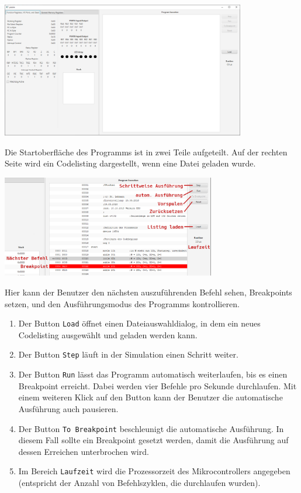 \documentclass[a4paper]{article}
\begin{document}
\begin{center}
    \includegraphics[width=0.8\textwidth]{img/startup}
\end{center}

Die Startoberfläche des Programms ist in zwei Teile aufgeteilt.
Auf der rechten Seite wird ein Codelisting dargestellt, wenn eine Datei geladen wurde.

\begin{center}
    \includegraphics[width=0.7\textwidth]{img/bprunview}
\end{center}

Hier kann der Benutzer den nächsten auszuführenden Befehl sehen, Breakpoints setzen, und den Ausführungsmodus des Programms kontrollieren.
\begin{enumerate}
\item Der Button \texttt{Load} öffnet einen Dateiauswahldialog, in dem ein neues Codelisting ausgewählt und geladen werden kann.
\item Der Button \texttt{Step} läuft in der Simulation einen Schritt weiter.
\item Der Button \texttt{Run} lässt das Programm automatisch weiterlaufen, bis es einen Breakpoint erreicht.
      Dabei werden vier Befehle pro Sekunde durchlaufen. Mit einem weiteren Klick auf den Button kann der Benutzer die automatische Ausführung auch pausieren.
\item Der Button \texttt{To Breakpoint} beschleunigt die automatische Ausführung. In diesem Fall sollte ein Breakpoint gesetzt werden, damit die Ausführung auf dessen Erreichen unterbrochen wird.
\item Im Bereich \texttt{Laufzeit} wird die Prozessorzeit des Mikrocontrollers angegeben (entspricht der Anzahl von Befehlszyklen, die durchlaufen wurden).
\end{enumerate}
\end{document}
